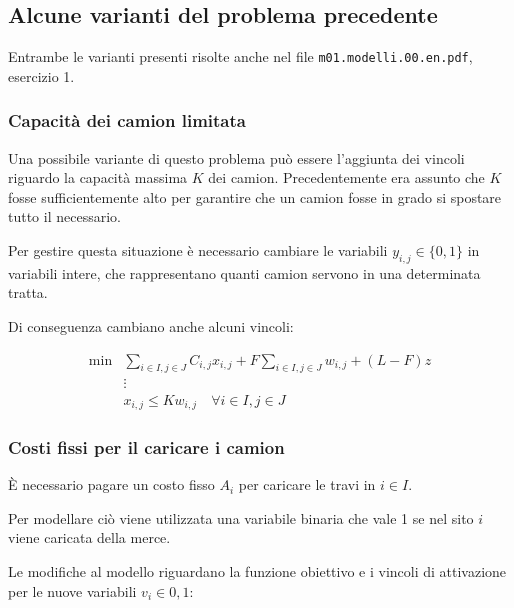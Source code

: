 

\subsection{Alcune varianti del problema precedente}

Entrambe le varianti presenti risolte anche nel file \texttt{m01.modelli.00.en.pdf}, esercizio 1.

\subsubsection{Capacità dei camion limitata}

Una possibile variante di questo problema può essere l'aggiunta dei vincoli riguardo la capacità massima $K$ dei camion. Precedentemente era assunto che $K$ fosse sufficientemente alto per garantire che un camion fosse in grado si spostare tutto il necessario.

Per gestire questa situazione è necessario cambiare le variabili $y_{i,j} \in \{0,1\}$ in variabili intere, che rappresentano quanti camion servono in una determinata tratta.

Di conseguenza cambiano anche alcuni vincoli:

\begin{align*}
	\min &\sum\limits_{i \in I, j \in J} C_{i,j} x_{i,j} + F \sum\limits_{i \in I, j \in J} w_{i,j}+ (L-F)z \\
	&\vdots \\
	&x_{i,j} \leq K w_{i,j} \quad\forall i \in I, j \in J 
\end{align*}

\subsubsection{Costi fissi per il caricare i camion}

\`E necessario pagare un costo fisso $A_i$ per caricare le travi in $i \in I$.

Per modellare ciò viene utilizzata una variabile binaria che vale 1 se nel sito $i$ viene caricata della merce.

Le modifiche al modello riguardano la funzione obiettivo e i vincoli di attivazione per le nuove variabili $v_i \in {0,1}$:

